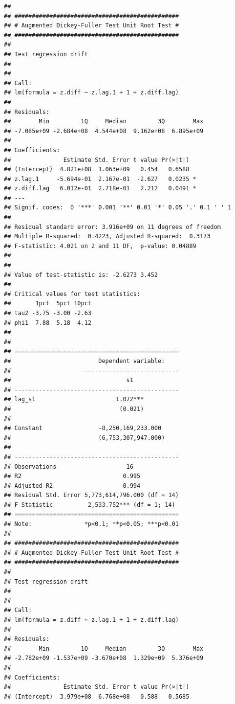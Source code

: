 \documentclass[
]{article}
\begin{document}
\begin{verbatim}
## 
## ############################################### 
## # Augmented Dickey-Fuller Test Unit Root Test # 
## ############################################### 
## 
## Test regression drift 
## 
## 
## Call:
## lm(formula = z.diff ~ z.lag.1 + 1 + z.diff.lag)
## 
## Residuals:
##        Min         1Q     Median         3Q        Max 
## -7.085e+09 -2.684e+08  4.544e+08  9.162e+08  6.895e+09 
## 
## Coefficients:
##               Estimate Std. Error t value Pr(>|t|)  
## (Intercept)  4.821e+08  1.063e+09   0.454   0.6588  
## z.lag.1     -5.694e-01  2.167e-01  -2.627   0.0235 *
## z.diff.lag   6.012e-01  2.718e-01   2.212   0.0491 *
## ---
## Signif. codes:  0 '***' 0.001 '**' 0.01 '*' 0.05 '.' 0.1 ' ' 1
## 
## Residual standard error: 3.916e+09 on 11 degrees of freedom
## Multiple R-squared:  0.4223, Adjusted R-squared:  0.3173 
## F-statistic: 4.021 on 2 and 11 DF,  p-value: 0.04889
## 
## 
## Value of test-statistic is: -2.6273 3.452 
## 
## Critical values for test statistics: 
##       1pct  5pct 10pct
## tau2 -3.75 -3.00 -2.63
## phi1  7.88  5.18  4.12
## 
## 
## ===============================================
##                         Dependent variable:    
##                     ---------------------------
##                                 s1             
## -----------------------------------------------
## lag_s1                       1.072***          
##                               (0.021)          
##                                                
## Constant                -8,250,169,233.000     
##                         (6,753,307,947.000)    
##                                                
## -----------------------------------------------
## Observations                    16             
## R2                             0.995           
## Adjusted R2                    0.994           
## Residual Std. Error 5,773,614,796.000 (df = 14)
## F Statistic          2,533.752*** (df = 1; 14) 
## ===============================================
## Note:               *p<0.1; **p<0.05; ***p<0.01
## 
## ############################################### 
## # Augmented Dickey-Fuller Test Unit Root Test # 
## ############################################### 
## 
## Test regression drift 
## 
## 
## Call:
## lm(formula = z.diff ~ z.lag.1 + 1 + z.diff.lag)
## 
## Residuals:
##        Min         1Q     Median         3Q        Max 
## -2.782e+09 -1.537e+09 -3.670e+08  1.329e+09  5.376e+09 
## 
## Coefficients:
##               Estimate Std. Error t value Pr(>|t|)  
## (Intercept)  3.979e+08  6.768e+08   0.588   0.5685  

\end{verbatim}
\end{document}
